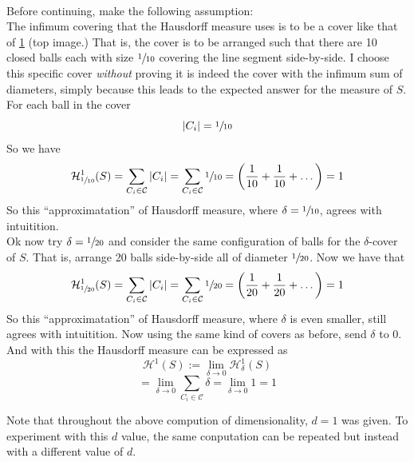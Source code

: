 \documentclass[11pt]{ekblite}
\begin{document}
\begin{example}
\begin{figure}[h]
		\label{fig:figure5}
	\end{figure}
	\\[0.2in]Before continuing, make the following assumption:
	\\[0.2in]The infimum covering that the Hausdorff measure uses is to be a cover like that of \ref{fig:figure5} (top image.) That is, the cover is to be arranged such that there are 10 closed balls each with size $\sfrac{1}{10}$ covering the line segment side-by-side. I choose this specific cover \textit{without} proving it is indeed the cover with the infimum sum of diameters, simply because this leads to the expected answer for the measure of $S$.
	\\[0.2in]For each ball in the cover
	\[|C_i| = \sfrac{1}{10}\]
	So we have
	\[\mathcal{H}_{\sfrac{1}{10}}^{1} (S) = \sum_{C_i \in \mathcal{C}} |C_i| = \sum_{C_i \in \mathcal{C}} \sfrac{1}{10} = \left( \frac{1}{10} + \frac{1}{10} + \dots \right) = 1\]
	So this ``approximatation'' of Hausdorff measure, where $\delta = \sfrac{1}{10}$, agrees with intuitition.
	\\[0.2in]Ok now try $\delta = \sfrac{1}{20}$ and consider the same configuration of balls for the $\delta$-cover of $S$. That is, arrange 20 balls side-by-side all of diameter $\sfrac{1}{20}$. Now we have that
	\[\mathcal{H}_{\sfrac{1}{20}}^{1} (S) = \sum_{C_i \in \mathcal{C}} |C_i| = \sum_{C_i \in \mathcal{C}} \sfrac{1}{20} = \left( \frac{1}{20} + \frac{1}{20} + \dots \right) = 1\]
	So this ``approximatation'' of Hausdorff measure, where $\delta$ is even smaller, still agrees with intuitition.
	Now using the same kind of covers as before, send $\delta$ to 0.
	\\[0.2in]And with this the Hausdorff measure can be expressed as
	\[\mathcal{H}^{1} (S) := \lim_{\delta \rightarrow 0} \mathcal{H}_{\delta}^{1} (S)\]
	\[= \lim_{\delta \rightarrow 0} \sum_{C_i \in \mathcal{C}} \delta = \lim_{\delta \rightarrow 0} 1 = 1\]
\end{example}
Note that throughout the above compution of dimensionality, $d=1$ was given. To experiment with this $d$ value, the same conputation can be repeated but instead with a different value of $d$.
\end{document}
